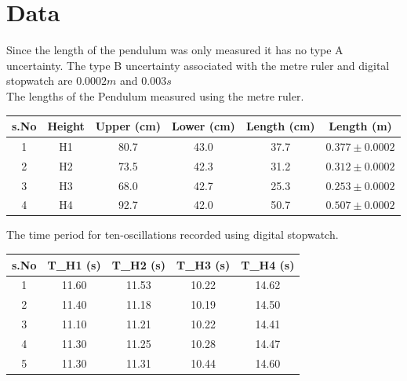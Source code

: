 \section{Data}

Since the length of the pendulum was only measured it has no type A uncertainty. The type B uncertainty associated with the metre ruler and digital stopwatch are $0.0002m$ and $0.003s$ \\
The lengths of the Pendulum measured using the metre ruler.
\begin{center}
\begin{tabular}{|c|c|c|c|c|c|}
\hline
\textbf{s.No} & \textbf{Height} & \textbf{Upper (cm)} & \textbf{Lower (cm)} & \textbf{Length (cm)} & \textbf{Length (m)} \\ \hline
1             & H1              & 80.7                & 43.0                & 37.7                 & $0.377 \pm 0.0002 $ \\ \hline
2             & H2              & 73.5                & 42.3                & 31.2                 & $0.312 \pm 0.0002 $ \\ \hline
3             & H3              & 68.0                & 42.7                & 25.3                 & $0.253 \pm 0.0002 $ \\ \hline
4             & H4              & 92.7                & 42.0                & 50.7                 & $0.507 \pm 0.0002$ \\ \hline
\end{tabular}
\end{center} 
The time period for ten-oscillations recorded using digital stopwatch.
\begin{center}
\begin{tabular}{|c|c|c|c|c|}
\hline
\textbf{s.No} & \textbf{T\_H1 (s)} & \textbf{T\_H2 (s)} & \textbf{T\_H3 (s)} & \textbf{T\_H4 (s)} \\ \hline
1             & 11.60              & 11.53              & 10.22              & 14.62              \\ \hline
2             & 11.40              & 11.18              & 10.19              & 14.50              \\ \hline
3             & 11.10              & 11.21              & 10.22              & 14.41              \\ \hline
4             & 11.30              & 11.25              & 10.28              & 14.47              \\ \hline
5             & 11.30              & 11.31              & 10.44              & 14.60              \\ \hline
\end{tabular}
\end{center}
